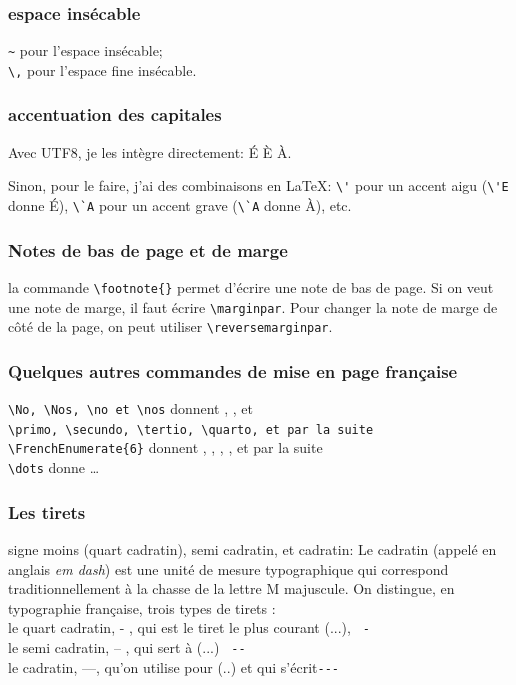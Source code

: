 \documentclass[a4paper,twoside,french,12pt]{article}
\begin{document}
\subsubsection{espace insécable}
\verb=~= pour l'espace insécable;\\
\verb=\,= pour l'espace fine insécable.

\subsubsection{accentuation des capitales}
Avec UTF8, je les intègre directement: É È À.

Sinon, pour le faire, j'ai des combinaisons en \LaTeX{}: \verb=\'= pour un accent aigu (\verb=\'E= donne \'E), \verb=\`A= pour un accent grave (\verb=\`A= donne À), etc.

\subsubsection{Notes de bas de page et de marge}
la commande \verb=\footnote{}= permet d'écrire une note de bas de page. Si on veut une note de marge, il faut écrire \verb=\marginpar=. Pour changer la note de marge de côté de la page, on peut utiliser \verb=\reversemarginpar=.


\subsubsection{Quelques autres commandes de mise en page française}

\verb=\No, \Nos, \no et \nos= donnent \No, \Nos, \no et \nos\\
\verb=\primo, \secundo, \tertio, \quarto, et par la suite \FrenchEnumerate{6}= donnent \primo, \secundo, \tertio, \quarto, et par la suite \\
\verb=\dots= donne \dots


\subsubsection{Les tirets}
\upshape
signe moins (quart cadratin), semi cadratin, et cadratin:
Le cadratin (appelé en anglais \textit{em dash}) est une unité de mesure typographique qui correspond traditionnellement à la chasse de la lettre M majuscule. On distingue, en typographie française, trois types de tirets :\\
le quart cadratin, - , qui est le tiret le plus courant (...), \verb= - = \\
le semi cadratin, -- , qui sert à (...) \verb= -- = \\
le cadratin, ---, qu'on utilise pour (..) et qui s'écrit\verb=---=\\
 
\end{document}

